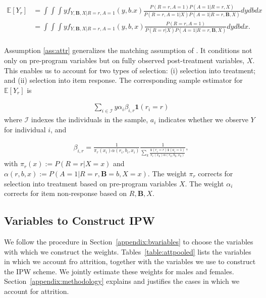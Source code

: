 \begin{align*} \label{eq:case2ipw}
\mathbb{E}[Y_r] & = \int \int \int y f_{Y,\bm{B},X|R=r,A=1}(y,b.x) \frac{P(R=r,A=1) P(A=1|R=r,X)}{P(R=r,A=1|X) P(A=1|R=r,\bm{B},X)} dydbdx \\
	            & = \int \int  \int y f_{Y,\bm{B},X|R=r,A=1}(y,b,x) \frac{P(R=r,A=1)}{P(R=r|X) P(A=1|R=r,\bm{B},X)} dydbdx. \\
\end{align*}

\noindent Assumption \ref{ass:attr} generalizes the matching assumption of \citet{Campbell_Conti_etal_2014_EarlyChildhoodInvestments}. It conditions not only on pre-program variables but on fully observed post-treatment variables, $X$. This enables us to account for two types of selection:  (i) selection into treatment; and (ii) selection into item response. The corresponding sample estimator for $\mathbb{E}[Y_r]$ is

\begin{align*}
\sum_{i \in \mathcal{I}} y \alpha_{i} \beta_{i,r} \mathbf{1}(r_i = r)
\end{align*}
\noindent where $\mathcal{I}$ indexes the individuals in the sample, $a_i$ indicates whether we observe $Y$ for individual $i$, and

\begin{align*}
	\beta_{i,r} = \frac{1}{\pi_r(x_i) \alpha(r_i,b_i,x_i)} \frac{1}{\sum_k{\frac{\mathbf{1}(r_i = r) \mathbf{1}(a_i = 1)}{\pi_r(x_k)\alpha(r_k,b_k,x_k)}}},
\end{align*}
\noindent with $\pi_r(x) := P(R=r|X=x)$ and $\alpha(r,b,x) := P(A=1|R=r,\bm{B}=b,X=x)$. The weight $\pi_r$ corrects for selection into treatment based on pre-program variables $X$. The weight $\alpha_{i}$ corrects for item non-response based on $R, \bm{B}, X$.\\

\subsection{Variables to Construct IPW}

\noindent We follow the procedure in Section~\ref{appendix:bvariables} to choose the variables with which we construct the weights. Tables~\ref{table:attpooled} lists the variables in which we account fro attrition, together with the variables we use to construct the IPW scheme. We jointly estimate these weights for males and females. Section~\ref{appendix:methodology} explains and justifies the cases in which we account for attrition.

